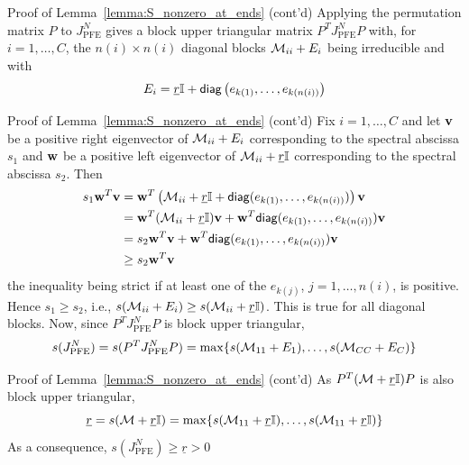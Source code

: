 \documentclass[aspectratio=169]{beamer}
\begin{document}
\begin{frame}{Proof of Lemma~\ref{lemma:S_nonzero_at_ends} (cont'd)}
	Applying the permutation matrix $P$ to $J_{\textrm{PFE}}^N$ gives a block upper triangular matrix $P^TJ_{\textrm{PFE}}^NP$ with, for $i=1,\ldots,C$, the $n(i)\times n(i)$ diagonal blocks $\mathcal{M}_{ii}+E_i$ being irreducible and with
	\[
	E_i = \underline{r}\mathbb{I}
	+\mathsf{diag}\left(e_{k(1)},\ldots,e_{k(n(i))}\right)
	\]
\end{frame}


\begin{frame}{Proof of Lemma~\ref{lemma:S_nonzero_at_ends} (cont'd)}
	Fix $i=1,\ldots,C$ and let $\mathbf{v}$ be a positive right eigenvector of $\mathcal{M}_{ii}+E_i$ corresponding to the spectral abscissa $s_1$ and $\mathbf{w}$ be a positive left eigenvector of $\mathcal{M}_{ii}+\underline{r}\mathbb{I}$ corresponding to the spectral abscissa $s_2$.
	Then
	\begin{align*}
	s_1\mathbf{w}^T\mathbf{v} &= 
	\mathbf{w}^T\left(\mathcal{M}_{ii}+\underline{r}\mathbb{I} +\mathsf{diag}(e_{k(1)},\ldots,e_{k(n(i))})\right)\mathbf{v} \\
	&= \mathbf{w}^T (\mathcal{M}_{ii}+\underline{r}\mathbb{I})\mathbf{v} + \mathbf{w}^T \mathsf{diag}(e_{k(1)},\ldots,e_{k(n(i))})\mathbf{v} \\
	&= s_2\mathbf{w}^T\mathbf{v} +\mathbf{w}^T \mathsf{diag}(e_{k(1)},\ldots,e_{k(n(i))})\mathbf{v} \\
	&\geq s_2\mathbf{w}^T\mathbf{v}
	\end{align*}
	the inequality being strict if at least one of the $e_{k(j)}$, $j=1,\ldots,n(i)$, is positive.
	Hence $s_1\geq s_2$, i.e., $s(\mathcal{M}_{ii}+E_i)\geq s(\mathcal{M}_{ii}+\underline{r}\mathbb{I})$. 
	This is true for all diagonal blocks. Now, since $P^TJ_{\textrm{PFE}}^N P$ is block upper triangular, 
	\[
	s(J_{\textrm{PFE}}^N)=s(P^TJ_{\textrm{PFE}}^N P) =
	\max\{s(\mathcal{M}_{11}+E_1),\ldots,s(\mathcal{M}_{CC}+E_C)\}
	\]
\end{frame}

\begin{frame}{Proof of Lemma~\ref{lemma:S_nonzero_at_ends} (cont'd)}
	As $P^T(\mathcal{M}+\underline{r}\mathbb{I})P$ is also block upper triangular,
	\[
	\underline{r} = s(\mathcal{M}+\underline{r}\mathbb{I}) =
	\max\{s(\mathcal{M}_{11}+\underline{r}\mathbb{I}),
	\ldots,
	s(\mathcal{M}_{11}+\underline{r}\mathbb{I})\}
	\]
	As a consequence, $s(J_{\textrm{PFE}}^N)\geq \underline{r}>0$
\end{frame}
\end{document}

